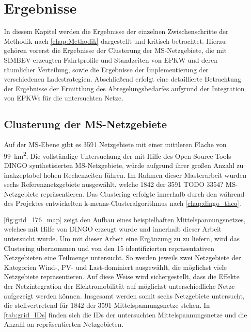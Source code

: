 
\section{Ergebnisse}

In diesem Kapitel werden die Ergebnisse der einzelnen Zwischenschritte der Methodik nach \autoref{chap:Methodik} dargestellt und kritisch betrachtet.
Hierzu gehören vorerst die Ergebnisse der Clusterung der \gls{MS}-Netzgebiete, die mit \gls{SIMBEV} erzeugten Fahrtprofile und Standzeiten von \gls{EPKW} und deren räumlicher Verteilung, sowie die Ergebnisse der Implementierung der verschiedenen Ladestrategien.
Abschließend erfolgt eine detaillierte Betrachtung der Ergebnisse der Ermittlung des Abregelungsbedarfes aufgrund der Integration von \glspl{EPKW} für die untersuchten Netze.


\subsection{Clusterung der MS-Netzgebiete}

Auf der \gls{MS}-Ebene gibt es \num{3591} Netzgebiete mit einer mittleren Fläche von \SI{99}{\km\squared}.
Die vollständige Untersuchung der mit Hilfe des Open Source Tools \gls{DINGO} synthetisierten \gls{MS}-Netzgebiete, würde aufgrund ihrer großen Anzahl zu inakzeptabel hohen Rechenzeiten führen.
Im Rahmen dieser Masterarbeit wurden sechs Referenznetzgebiete ausgewählt, welche \num{1842} der \num{3591} {\color{red} TODO 3354?} \gls{MS}-Netzgebiete repräsentieren.
Das Clustering erfolgte innerhalb \cite{Schachler} durch den während des \openego Projektes entwickelten k-means-Clusteralgorithmus nach \autoref{chap:dingo_theo}.



\autoref{fig:grid_176_map} zeigt den Aufbau eines beispielhaften Mittelspannungsnetzes, welches mit Hilfe von \gls{DINGO} erzeugt wurde und innerhalb dieser Arbeit untersucht wurde.
Um mit dieser Arbeit eine Ergänzung zu \cite{Schachler} zu liefern, wird das Clustering \cite{Schachler} übernommen und von den \num{15} identifizierten repräsentativen Netzgebieten eine Teilmenge untersucht.
So werden jeweils zwei Netzgebiete der Kategorien Wind-, \gls{PV}- und Last-dominiert ausgewählt, die möglichst viele Netzgebiete repräsentieren.
Auf diese Weise wird sichergestellt, dass die Effekte der Netzintegration der Elektromobilität auf möglichst unterschiedliche Netze aufgezeigt werden können.
Insgesamt werden somit sechs Netzgebiete untersucht, die stellvertretend für \num{1842} der \num{3591} Mittelspannungsnetze stehen.
In \autoref{tab:grid_IDs} finden sich die \glspl{ID} der untersuchten Mittelspannungsnetze und die Anzahl an repräsentierten Netzgebieten.

